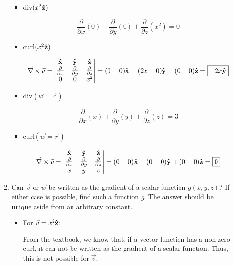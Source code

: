 \begin{enumerate}
\begin{enumerate}
\begin{itemize}
          \item div$(x^2\bold{\hat{z}})$

            $$\boxed{\frac{\partial}{\partial x}(0)+\frac{\partial}{\partial y}(0)+\frac{\partial}{\partial z}(x^2)=0}$$

          \item curl$(x^2\bold{\hat{z}})$

            $$\vec{\nabla}\times\vec{v}=\left|\begin{matrix}\bold{\hat{x}} & \bold{\hat{y}} & \bold{\hat{z}}\\ \frac{\partial}{\partial x} & \frac{\partial}{\partial y} & \frac{\partial}{\partial z}\\ 0 & 0 & x^2\end{matrix}\right|=(0-0)\bold{\hat{x}}-(2x-0)\bold{\hat{y}}+(0-0)\bold{\hat{z}}=\boxed{-2x\bold{\hat{y}}}$$

          \item div$(\vec{w}=\vec{r})$

            $$\boxed{\frac{\partial}{\partial x}(x)+\frac{\partial}{\partial y}(y)+\frac{\partial}{\partial z}(z)=3}$$

          \item curl$(\vec{w}=\vec{r})$

            $$\vec{\nabla}\times\vec{v}=\left|\begin{matrix}\bold{\hat{x}} & \bold{\hat{y}} & \bold{\hat{z}}\\ \frac{\partial}{\partial x} & \frac{\partial}{\partial y} & \frac{\partial}{\partial z}\\ x & y & z\end{matrix}\right|=(0-0)\bold{\hat{x}}-(0-0)\bold{\hat{y}}+(0-0)\bold{\hat{z}}=\boxed{0}$$

        \end{itemize}

      \item Can $\vec{v}$ or $\vec{w}$ be written as the gradient of a scalar function $g(x,y,z)$? If either case is possible, find
such a function $g$. The answer should be unique aside from an arbitrary constant.

        \begin{itemize}

          \item For $\vec{v}=x^2\bold{\hat{z}}$:

            From the textbook, we know that, if a vector function has a non-zero curl, it can not be written as the gradient of a scalar function. Thus, this is not possible for $\vec{v}$.


\end{itemize}
\end{enumerate}
\end{enumerate}
